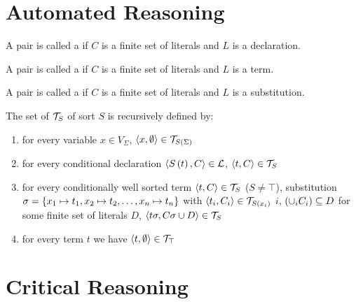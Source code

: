 \section{Automated Reasoning}

\begin{defi}
A pair  is called a  if $C$ is a finite set of literals and $L$ is a declaration.
\cite{conf/ijcai/Weidenbach93}
\end{defi}

\begin{defi}
A pair  is called a  if $C$ is a finite set of literals and $L$ is a term.
\cite{conf/ijcai/Weidenbach93}
\end{defi}

\begin{defi}
A pair  is called a  if $C$ is a finite set of literals and $L$ is a substitution.
\cite{conf/ijcai/Weidenbach93}
\end{defi}

\begin{defi}
The set of  $\mathcal{T}_S$ of sort $S$ is recursively defined by:
\begin{enumerate}
 \item for every variable $x\in V_{\Sigma}$, $\left\langle x,\emptyset\right\rangle\in\mathcal{T}_{S\left(\Sigma\right)}$
 \item for every conditional declaration $\left\langle S\left(t\right),C\right\rangle\in\mathcal{L}$, $\left\langle t,C\right\rangle\in\mathcal{T}_S$
 \item for every conditionally well sorted term $\left\langle t,C\right\rangle\in\mathcal{T}_S$ ($S\neq\top$), substitution $\sigma=\left\{ x_1\mapsto t_1,x_2\mapsto t_2,\ldots,x_n\mapsto t_n\right\}$ with $\left\langle t_i,C_i\right\rangle\in\mathcal{T}_{S\left(x_i\right)}$ \faTx{} $i$, $\left( \displaystyle\cup_iC_i\right)\subseteq D$ for some finite set of literals $D$, $\left\langle t\sigma,C\sigma\cup D\right\rangle\in\mathcal{T}_S$
 \item for every term $t$ we have $\left\langle t,\emptyset\right\rangle\in\mathcal{T}_{\top}$
\end{enumerate}
\cite{conf/ijcai/Weidenbach93}
\end{defi}


\section{Critical Reasoning}

